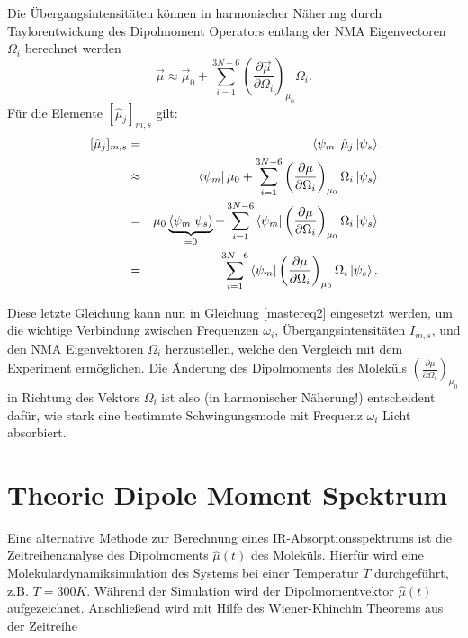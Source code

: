\documentclass[a4paper,12pt]{article}
\begin{document}
Die Übergangsintensitäten können in harmonischer Näherung durch Taylorentwickung des Dipolmoment Operators entlang der NMA Eigenvectoren $\Omega_i$ berechnet werden
\begin{equation}\label{mutaylor}
 \vec{\mu} \approx  \vec{\mu}_0 + \sum_{i=1}^{3N-6} \left(\frac{\partial \vec{\mu}}{\partial \Omega_i}\right)_{\mu_0} \Omega_i.
\end{equation}
Für die Elemente $[\hat{\mu}_j]_{m,s}$ gilt:
\begin{eqnarray}\label{maximu}
  [\hat{\mu}_j]_{m,s}&=&\bra{\psi_m}\hat{\mu}_j \ket{\psi_s} \nonumber \\
                     &\approx&\bra{\psi_m} \mu_0 + \sum_{i=1}^{3N-6} \left(\frac{\partial \mu}{\partial \Omega_i}\right)_{\mu_0} \Omega_i \ket{\psi_s} \nonumber\\
                     &=&\mu_0 \underbrace{\braket{\psi_m|\psi_s}}_{=0} + \sum_{i=1}^{3N-6} \bra{\psi_m}  \left(\frac{\partial \mu}{\partial \Omega_i}\right)_{\mu_0} \Omega_i \ket{\psi_s} \nonumber\\
                     &=&\sum_{i=1}^{3N-6} \bra{\psi_m}  \left(\frac{\partial \mu}{\partial \Omega_i}\right)_{\mu_0} \Omega_i \ket{\psi_s}.
\end{eqnarray}

Diese letzte Gleichung kann nun in Gleichung \ref{mastereq2} eingesetzt werden, um die wichtige Verbindung zwischen Frequenzen $\omega_i$, Übergangsintensitäten $I_{m,s}$, und den NMA
Eigenvektoren $\Omega_i$ herzustellen, welche den Vergleich mit dem Experiment ermöglichen.
Die Änderung des Dipolmoments des Moleküls $\left(\frac{\partial \mu}{\partial \Omega_i}\right)_{\mu_0}$ in Richtung des Vektors $\Omega_i$ ist also (in harmonischer Näherung!) 
entscheident dafür, wie stark eine bestimmte Schwingungsmode mit Frequenz $\omega_i$ Licht absorbiert.

\section{Theorie Dipole Moment Spektrum}\label{dipolespec}
Eine alternative Methode zur Berechnung eines IR-Absorptionsspektrums ist die Zeitreihenanalyse des Dipolmoments $\hat{\mu}(t)$ des Moleküls. Hierfür wird eine Molekulardynamiksimulation
des Systems bei einer Temperatur $T$ durchgeführt, z.B. $T=300K$. Während der Simulation wird der Dipolmomentvektor $\hat{\mu}(t)$ aufgezeichnet. Anschließend wird mit Hilfe des
Wiener-Khinchin Theorems aus der Zeitreihe 
\end{document}
